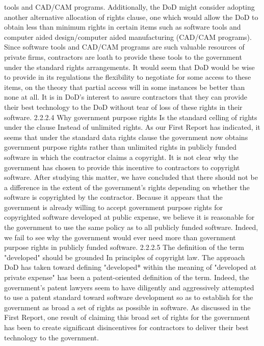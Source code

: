 \documentclass[12pt]{article}
\begin{document}
tools and CAD/CAM programs.
Additionally, the DoD might consider adopting another alternative allocation of rights clause, one
which would allow the DoD to obtain less than minimum rights in certain items such as software tools
and computer aided design/computer aided manufacturing (CAD/CAM programs). Since software
tools and CAD/CAM programs are such valuable resources of private firms, contractors are loath to
provide these tools to the government under the standard rights arrangements. It would seem that
DoD would be wise to provide in its regulations the flexibility to negotiate for some access to these
items, on the theory that partial access will in some instances be better than none at all. It is in DoD's
interest to assure contractors that they can provide their best technology to the DoD without tear of
loss of these rights in their software.
2.2.2.4 Why government purpose rights Is the standard celling of rights under the clause
Instead of unlimited rights.
As our First Report has indicated, it seems that under the standard data rights clause the government
now obtains government purpose rights rather than unlimited rights in publicly funded software in
which the contractor claims a copyright. It is not clear why the government has chosen to provide this
incentive to contractors to copyright software. After studying this matter, we have concluded that
there should not be a difference in the extent of the government's rights depending on whether the
software is copyrighted by the contractor. Because it appears that the government is already willing
to accept government purpose rights for copyrighted software developed at public expense, we believe it is reasonable for the government to use the same policy as to all publicly funded software.
Indeed, we fail to see why the government would ever need more than government purpose rights in
publicly funded software.
2.2.2.5 The definition of the term "developed" should be grounded In principles of copyright
law.
The approach DoD has taken toward defining "developed* within the meaning of "developed at
private expense" has been a patent-oriented definition of the term. Indeed, the government's patent
lawyers seem to have diligently and aggressively attempted to use a patent standard toward software
development so as to establish for the government as broad a set of rights as possible in software.
As discussed in the First Report, one result of claiming this broad set of rights for the government has
been to create significant disincentives for contractors to deliver their best technology to the government.
\end{document}
